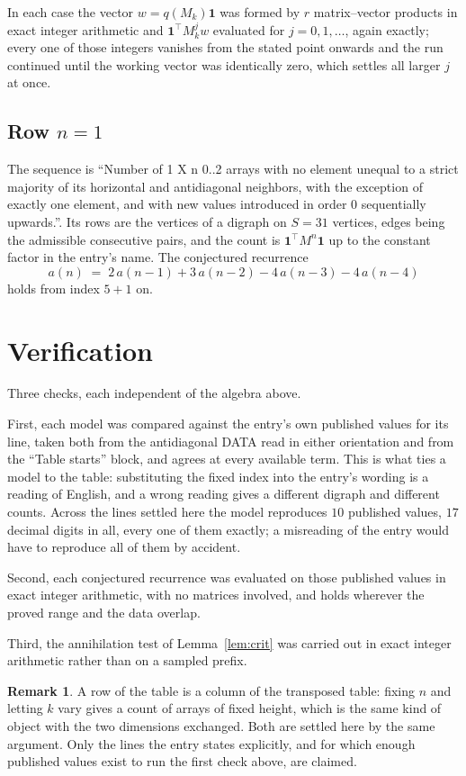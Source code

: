 \documentclass[11pt,a4paper]{article}
\theoremstyle{plain}
\theoremstyle{definition}
\newtheorem{remark}[theorem]{Remark}
\begin{document}
In each case the vector $w=q(M_k)\mathbf{1}$ was formed by $r$ matrix--vector products in
exact integer arithmetic and $\mathbf{1}^{\!\top}M_k^{j}w$ evaluated for $j=0,1,\dots$,
again exactly; every one of those integers vanishes from the stated point onwards and the run
continued until the working vector was identically zero, which settles all larger $j$ at once.

\subsection*{Row $n$$=1$}
The sequence is ``Number of 1 X n 0..2 arrays with no element unequal to a strict majority of its horizontal and antidiagonal neighbors, with the exception of exactly one element, and with new values introduced in order 0 sequentially upwards.''. Its rows are the vertices of a digraph on
$S=31$ vertices, edges being the admissible consecutive pairs, and the count is
$\mathbf{1}^{\!\top}M^{n}\mathbf{1}$ up to the constant factor in the entry's name.
The conjectured recurrence
\[
a(n)\;=\;2\,a(n-1) + 3\,a(n-2) - 4\,a(n-3) - 4\,a(n-4)
\]
holds from index $5+1$ on.

\section{Verification}

Three checks, each independent of the algebra above.

First, each model was compared against the entry's own published values for its line, taken
both from the antidiagonal DATA read in either orientation and from the ``Table starts''
block, and agrees at every available term. This is what ties a model to the table:
substituting the fixed index into the entry's wording is a reading of English, and a wrong
reading gives a different digraph and different counts. Across the lines settled here the
model reproduces $10$ published values, $17$ decimal digits in all, every one of
them exactly; a misreading of the entry would have to reproduce all of them by accident.

Second, each conjectured recurrence was evaluated on those published values in exact
integer arithmetic, with no matrices involved, and holds wherever the proved range and the
data overlap.

Third, the annihilation test of Lemma~\ref{lem:crit} was carried out in exact integer
arithmetic rather than on a sampled prefix.

\begin{remark}
A row of the table is a column of the transposed table: fixing $n$ and letting $k$ vary gives a
count of arrays of fixed height, which is the same kind of object with the two dimensions
exchanged. Both are settled here by the same argument. Only the lines the entry states
explicitly, and for which enough published values exist to run the first check above, are
claimed.
\end{remark}
\end{document}
